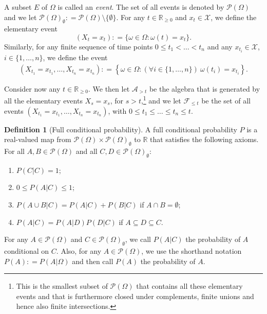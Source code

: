 \documentclass[10pt]{paper}
\theoremstyle{definition}
\newtheorem{definition}{Definition}
\newcommand{\reals}{\mathbb{R}}
\newcommand{\realsnonneg}{\reals_{\geq 0}}
\newcommand{\states}{\mathcal{X}}
\newcommand{\paths}{\Omega}
\newcommand{\path}{\omega}
\newcommand{\power}{\mathcal{P}(\paths)}
\newcommand{\nonemptypower}{\power_{\emptyset}}
\newcommand{\events}{\mathcal{E}}
\newcommand{\filter}[1][t]{\mathcal{F}_{#1}}
\newcommand{\coloneqq}{:\!=}
\begin{document}
A subset $E$ of $\paths$ is called an \emph{event}. The set of all events is denoted by $\power$ and we let $\nonemptypower\coloneqq\power\setminus\{\emptyset\}$. For any $t\in\realsnonneg$ and $x_t\in\states$, we define the elementary event
\begin{equation*}
(X_t=x_t)\coloneqq\{\path\in\paths\colon\path(t)=x_t\}.
\end{equation*}
Similarly, for any finite sequence of time points $0\leq t_1<\dots<t_n$ and any $x_{t_i}\in\states$, $i\in\{1,\dots,n\}$, we define the event
\begin{align*}
\left(X_{t_1}=x_{t_1}, \dots, X_{t_n}=x_{t_n}\right)
\coloneqq%
\left\{\path\in\paths\colon(\forall i\in\{1,\dots,n\})~\path(t_i)=x_{t_i}\right\}.%
\end{align*}

Consider now any $t\in\realsnonneg$. We then let $\mathcal{A}_{>t}$ be the algebra that is generated by all the elementary events $X_s=x_s$, for $s> t$,\footnote{This is the smallest subset of $\power$ that contains all these elementary events and that is furthermore closed under complements, finite unions and hence also finite intersections.} and we let $\mathcal{F}_{\leq t}$ be the set of all events $\left(X_{t_1}=x_{t_1}, \dots, X_{t_n}=x_{t_n}\right)$, with $0\leq t_1\leq\dots\leq t_n\leq t$.%

\begin{definition}[Full conditional probability]\label{def:cond_prob}
A full conditional probability $P$ is a real-valued map from $\power\times\nonemptypower$ to $\reals$ that satisfies the following axioms. For all $A,B\in\power$ and all \mbox{$C,D\in\nonemptypower$}:
\vspace{5pt}

\begin{enumerate}[label=F\arabic*:]
\item
$P(C\vert C)=1$;
\item
$0\leq P(A\vert C)\leq 1$;
\item
$P(A\cup B\vert C)=P(A\vert C)+P(B\vert C)$ if $A\cap B=\emptyset$;
\item
$P(A\vert C)=P(A\vert D)P(D\vert C)$ if $A\subseteq D\subseteq C$.
\end{enumerate}
\vspace{5pt}

\noindent
For any $A\in\power$ and $C\in\nonemptypower$, we call $P(A\vert C)$ the probability of $A$ conditional on $C$. Also, for any $A\in\power$, we use the shorthand notation $P(A)\coloneqq P(A\vert\paths)$ and then call $P(A)$ the probability of $A$.
\end{definition}
\end{document}
